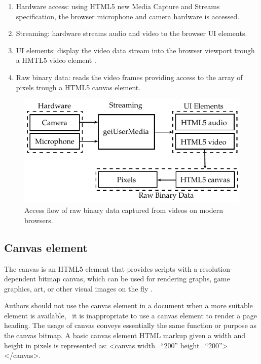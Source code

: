 \begin{enumerate}
  \item  Hardware access: using HTML5 new Media Capture and Streams specification, the browser microphone and camera hardware is accessed.
  \item Streaming: hardware streams audio and video to the browser UI elements.
  \item UI elements: display the video data stream into the browser viewport trough a HMTL5 video element \cite{WC2006}.
  \item Raw binary data: reads the video frames providing access to the array of pixels trough a HTML5 canvas element.
\end{enumerate}

\begin{figure}[!htb]
  \centering
  \includegraphics{chapters/basic_concepts/get_user_media.pdf}
  \caption{Access flow of raw binary data captured from videos on modern browsers.}
  \label{figure:get_user_media}
\end{figure}


\subsection{Canvas element} %
\label{sub:basic_concepts:web:canvas_element}

The canvas is an HTML5 element that provides scripts with a resolution-dependent bitmap canvas, which can be used for rendering graphs, game graphics, art, or other visual images on the fly \cite{Canvas2013}.

Authors should not use the canvas element in a document when a more suitable element is available, \eg\ it is inappropriate to use a canvas element to render a page heading. The usage of canvas conveys essentially the same function or purpose as the canvas bitmap. A basic canvas element HTML markup given a width and height in pixels is represented as: <canvas width=``200'' height=``200''></canvas>.

